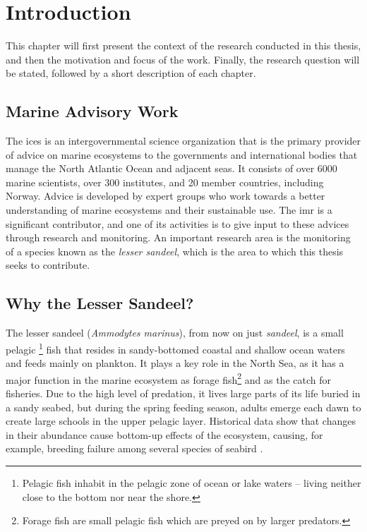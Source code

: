 \chapter{Introduction}
    This chapter will first present the context of the research conducted in this thesis, and then the motivation and focus of the work. Finally, the research question will be stated, followed by a short description of each chapter. 
    
    
    

\section{Marine Advisory Work}
    The \gls{ices} is an intergovernmental science organization that is the primary provider of advice on marine ecosystems to the governments and international bodies that manage the North Atlantic Ocean and adjacent seas\cite{ICES2020}. It consists of over 6000 marine scientists, over 300 institutes, and 20 member countries, including Norway. Advice is developed by expert groups who work towards a better understanding of marine ecosystems and their sustainable use. The \gls{imr} is a significant  contributor, and one of its activities is to give input to these advices through research and monitoring. An important research area is the monitoring of a species known as the \textit{lesser sandeel}, which is the area to which this thesis seeks to contribute.
    
\section{Why the Lesser Sandeel?}
    The lesser sandeel (\textit{Ammodytes marinus}), from now on just \textit{sandeel}, is
    a small pelagic \footnote{Pelagic fish inhabit in the pelagic zone of ocean or lake waters – living neither close to the bottom nor near the shore.} fish that resides in sandy-bottomed coastal and shallow ocean waters and feeds mainly on plankton. It plays a key role in the North Sea, as it has a major function in the marine ecosystem as forage fish\footnote{Forage fish are small pelagic fish which are preyed on by larger predators.} and as the catch for fisheries. Due to the high level of predation, it lives large parts of its life buried in a sandy seabed, but during the spring feeding season, adults emerge each dawn to create large schools in the upper pelagic layer. Historical data show that changes in their abundance cause bottom-up effects of the ecosystem, causing, for example, breeding failure among several species of seabird \cite{johnsen2017collective}. 
    
